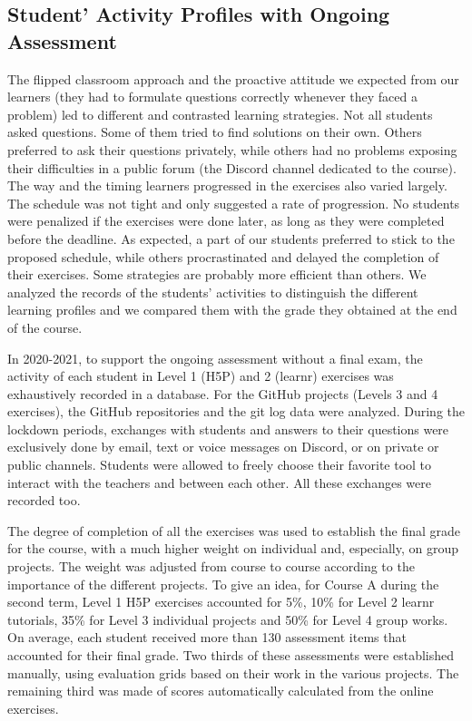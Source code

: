 \documentclass{aims}
\theoremstyle{definition}
\begin{document}
\hypertarget{student-activity-profiles-with-ongoing-assessment}{%
\subsection{Student' Activity Profiles with Ongoing
Assessment}\label{student-activity-profiles-with-ongoing-assessment}}

The flipped classroom approach and the proactive attitude we expected
from our learners (they had to formulate questions correctly whenever
they faced a problem) led to different and contrasted learning
strategies. Not all students asked questions. Some of them tried to find
solutions on their own. Others preferred to ask their questions
privately, while others had no problems exposing their difficulties in a
public forum (the Discord channel dedicated to the course). The way and
the timing learners progressed in the exercises also varied largely. The
schedule was not tight and only suggested a rate of progression. No
students were penalized if the exercises were done later, as long as
they were completed before the deadline. As expected, a part of our
students preferred to stick to the proposed schedule, while others
procrastinated and delayed the completion of their exercises. Some
strategies are probably more efficient than others. We analyzed the
records of the students' activities to distinguish the different
learning profiles and we compared them with the grade they obtained at
the end of the course.

In 2020-2021, to support the ongoing assessment without a final exam,
the activity of each student in Level 1 (H5P) and 2 (learnr) exercises
was exhaustively recorded in a database. For the GitHub projects (Levels
3 and 4 exercises), the GitHub repositories and the git log data were
analyzed. During the lockdown periods, exchanges with students and
answers to their questions were exclusively done by email, text or voice
messages on Discord, or on private or public channels. Students were
allowed to freely choose their favorite tool to interact with the
teachers and between each other. All these exchanges were recorded too.

The degree of completion of all the exercises was used to establish the
final grade for the course, with a much higher weight on individual and,
especially, on group projects. The weight was adjusted from course to
course according to the importance of the different projects. To give an
idea, for Course A during the second term, Level 1 H5P exercises
accounted for 5\%, 10\% for Level 2 learnr tutorials, 35\% for Level 3
individual projects and 50\% for Level 4 group works. On average, each
student received more than 130 assessment items that accounted for their
final grade. Two thirds of these assessments were established manually,
using evaluation grids based on their work in the various projects. The
remaining third was made of scores automatically calculated from the
online exercises.
\end{document}
